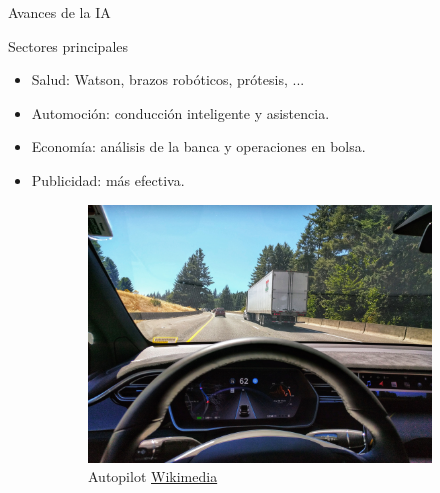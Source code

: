 \begin{frame}[fragile]{Avances de la IA}
\vspace{10px}
\pause
{}
\begin{block}{Sectores principales}
	\begin{itemize}
		\item Salud: Watson, brazos robóticos, prótesis, ...
		\pause
		\item Automoción: conducción inteligente y asistencia.
		\pause
		\item Economía: análisis de la banca y operaciones en bolsa.
		\pause
		\item Publicidad: más efectiva.
	\end{itemize}
\end{block}
\begin{figure}
	\centering
	\pause
	\begin{subfigure}{0.45\textwidth}
		\centering
		\includegraphics[scale=0.025]{./EtapaModerna/Imagenes/autopilot.jpg}
		\caption{Autopilot \href{https://commons.wikimedia.org/wiki/File:Tesla_Autopilot_Engaged_in_Model_X.jpg}{Wikimedia}}
	\end{subfigure}
	\pause
	\begin{subfigure}{0.45\textwidth}
		\centering

\end{subfigure}
\end{figure}
\end{frame}
